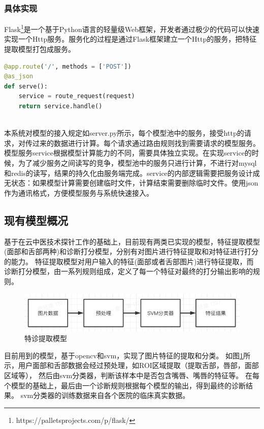 \subsubsection{具体实现}
Flask\footnote{https://palletsprojects.com/p/flask/}是一个基于Python语言的轻量级Web框架，开发者通过极少的代码可以快速实现一个Http服务。服务化的过程是通过Flask框架建立一个Http的服务，把特征提取模型打包成服务。

\begin{lstlisting}[language={Python}, title=server.py]
@app.route('/', methods = ['POST'])
@as_json
def serve():
    service = route_request(request)
    return service.handle()
    
\end{lstlisting}

本系统对模型的接入规定如server.py所示，每个模型池中的服务，接受http的请求，对传过来的数据进行计算。每个请求通过路由规则找到需要请求的模型服务。模型服务service根据模型计算能力的不同，需要具体独立实现。在实现service的时候，为了减少服务之间读写的竞争，模型池中的服务只进行计算，不进行对mysql和redis的读写，结果的持久化由服务端完成。service的内部逻辑需要把服务设计成无状态：如果模型计算需要创建临时文件，计算结束需要删除临时文件。使用json作为通讯格式，方便模型服务与系统快速接入。



\subsection{现有模型概况}
基于在云中医技术探针工作的基础上，目前现有两类已实现的模型，特征提取模型(面部和舌部两种)和诊断打分模型，分别有对图片进行特征提取和对特征进行打分的能力。
特征提取模型对用户输入的特征(面部或者舌部图片)进行特征提取，而诊断打分模型，由一系列规则组成，定义了每一个特征对最终的打分输出影响的规则。

\begin{figure}[ht]
    \centering
    \includegraphics[width=15cm]{images/model.png}
    \caption{特诊提取模型}
    \label{fig:my_model}
\end{figure}
目前用到的模型，基于opencv和svm，实现了图片特征的提取和分类。
如图\ref{fig:my_model}所示，用户面部和舌部数据会经过预处理，如ROI区域提取（提取舌部，唇部，面部区域等），
然后由svm分类器，判断该样本中是否包含嘴唇、嘴唇的特征等。
在每个模型的基础上，最后由一个诊断规则根据每个模型的输出，得到最终的诊断结果。
svm分类器的训练数据来自各个医院的临床真实数据。

